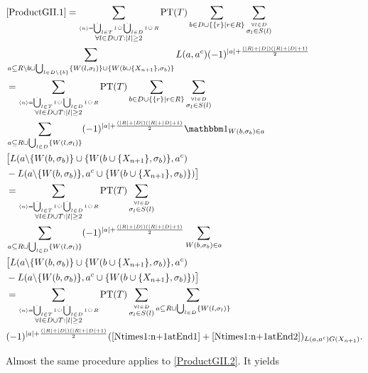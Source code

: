 \documentclass[b5paper,draft,openbib,12pt]{memoir}
\DeclareMathOperator{\dotCup}{\mathop{\dot{\bigcup}}}
\DeclareMathOperator{\dotcup}{\mathop{\dot{\cup}}}
\newcommand{\id}{{\mathbbm 1}}
\begin{document}
\begin{align}\notag
&\eqref{ProductGII.1}=\sum_{\stackrel{\langle n \rangle = \dotCup_{l\in T}l \dotcup \dotCup_{l\in D}l \dotcup R}{\forall l \in D\cup T: |l|\ge 2}} \text{PT}(T) \sum_{b\in D \cup \{\{r\}\mid r \in R\}} \sum_{\stackrel{\forall l \in D}{\sigma_l \in S(l)}}\\\notag
 &\sum_{a \subseteq R\backslash b \cup \bigcup_{l \in D\backslash \{b\}}\{W(l,\sigma_l)\} \cup \{W(b\cup \{X_{n+1}\},\sigma_b)\}} L(a,a^c) (-1)^{|a|+ \frac{(|R|+|D|)(|R|+|D|+1)}{2}}\\\notag
 &=\sum_{\stackrel{\langle n \rangle = \dotCup_{l\in T}l \dotcup \dotCup_{l\in D}l \dotcup R}{\forall l \in D\cup T: |l|\ge 2}} \text{PT}(T) \sum_{b\in D \cup \{\{r\}\mid r \in R\}} \sum_{\stackrel{\forall l \in D}{\sigma_l \in S(l)}} \\\notag
 &\sum_{a \subseteq R \cup \bigcup_{l \in D}\{W(l,\sigma_l)\}} (-1)^{|a|+ \frac{(|R|+|D|)(|R|+|D|+1)}{2}}\id_{W(b,\sigma_b)\in a} \\\notag
& \big[L(a\backslash \{W(b,\sigma_b)\} \cup \{W(b\cup \{X_{n+1}\},\sigma_b)\},a^c) \\\notag
& -L(a\backslash \{W(b,\sigma_b)\},a^c \cup \{W(b\cup \{X_{n+1}\},\sigma_b)\}) \big]\\\notag
&=\sum_{\stackrel{\langle n \rangle = \dotCup_{l\in T}l \dotcup \dotCup_{l\in D}l \dotcup R}{\forall l \in D\cup T: |l|\ge 2}} \text{PT}(T)  \sum_{\stackrel{\forall l \in D}{\sigma_l \in S(l)}} \\\notag
 &\sum_{a \subseteq R \cup \bigcup_{l \in D}\{W(l,\sigma_l)\}} (-1)^{|a|+ \frac{(|R|+|D|)(|R|+|D|+1)}{2}}
 \sum_{W(b,\sigma_b) \in a }  \\\notag
& \big[L(a\backslash \{W(b,\sigma_b)\} \cup \{W(b\cup \{X_{n+1}\},\sigma_b)\},a^c) \\\notag
& -L(a\backslash \{W(b,\sigma_b)\},a^c \cup \{W(b\cup \{X_{n+1}\},\sigma_b)\}) \big]\\\notag
&=\sum_{\stackrel{\langle n \rangle = \dotCup_{l\in T}l \dotcup \dotCup_{l\in D}l \dotcup R}{\forall l \in D\cup T: |l|\ge 2}} \text{PT}(T)  \sum_{\stackrel{\forall l \in D}{\sigma_l \in S(l)}} \sum_{a \subseteq R \cup \bigcup_{l \in D}\{W(l,\sigma_l)\}} \\
 & (-1)^{|a|+ \frac{(|R|+|D|)(|R|+|D|+1)}{2}}
 (\eqref{Ntimes1:n+1atEnd1}+\eqref{Ntimes1:n+1atEnd2})_{L(a,a^c)G(X_{n+1})}.
\end{align}

Almost the same procedure applies to \eqref{ProductGII.2}. It yields %
\end{document}
